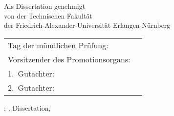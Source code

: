\thispagestyle{empty}


\vspace{4cm}
\begin{center}
        Als Dissertation genehmigt\\
        von der Technischen Fakultät\\
        der Friedrich-Alexander-Universität Erlangen-Nürnberg
\end{center}
    

\vspace{2cm}
\begin{tabular}{ll}
    Tag der mündlichen Prüfung:& 	 \\

    Vorsitzender des Promotionsorgans: 		& \\
    1.~Gutachter: 		& \myProf\\
    2.~Gutachter: 		& \myOtherProf\\

\end{tabular}

\vfill

\noindent\myName: \textit{\myTitle,} Dissertation,
\textcopyright\ \myTime

    
\bigskip

